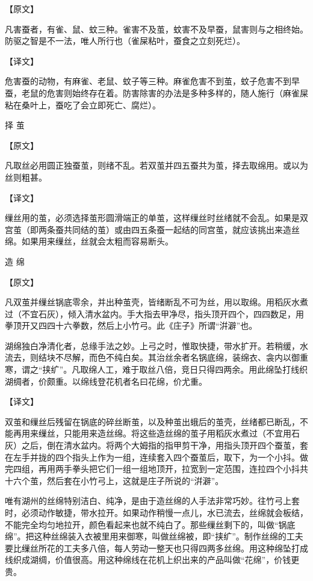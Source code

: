 \documentclass[12pt,UTF8]{ctexbook}
\begin{document}
【原文】

凡害蚕者，有雀、鼠、蚊三种。雀害不及茧，蚊害不及早蚕，鼠害则与之相终始。防驱之智是不一法，唯人所行也（雀屎粘叶，蚕食之立刻死烂）。

【译文】

危害蚕的动物，有麻雀、老鼠、蚊子等三种。麻雀危害不到茧，蚊子危害不到早蚕，老鼠的危害则始终存在着。防害除害的办法是多种多样的，随人施行（麻雀屎粘在桑叶上，蚕吃了会立即死亡、腐烂）。

择 茧

【原文】

凡取丝必用圆正独蚕茧，则绪不乱。若双茧并四五蚕共为茧，择去取绵用。或以为丝则粗甚。

【译文】

缫丝用的茧，必须选择茧形圆滑端正的单茧，这样缫丝时丝绪就不会乱。如果是双宫茧（即两条蚕共同结的茧）或由四五条蚕一起结的同宫茧，就应该挑出来造丝绵。如果用来缫丝，丝就会太粗而容易断头。

造 绵

【原文】

凡双茧并缫丝锅底零余，并出种茧壳，皆绪断乱不可为丝，用以取绵。用稻灰水煮过（不宜石灰），倾入清水盆内。手大指去甲净尽，指头顶开四个，四四数足，用拳顶开又四四十六拳数，然后上小竹弓。此《庄子》所谓“洴澼”也。

湖绵独白净清化者，总缘手法之妙。上弓之时，惟取快捷，带水扩开。若稍缓，水流去，则结块不尽解，而色不纯白矣。其治丝余者名锅底绵，装绵衣、衾内以御重寒，谓之“挟纩”。凡取绵人工，难于取丝八倍，竞日只得四两余。用此绵坠打线织湖绸者，价颇重。以绵线登花机者名曰花绵，价尤重。

【译文】

双茧和缫丝后残留在锅底的碎丝断茧，以及种茧出蛾后的茧壳，丝绪都已断乱，不能再用来缫丝，只能用来造丝绵。将这些造丝绵的茧子用稻灰水煮过（不宜用石灰）之后，倒在清水盆内。将两个大姆指的指甲剪干净，用指头顶开四个蚕茧，套在左手并拢的四个指头上作为一组，连续套入四个蚕茧后，取下，为一个小抖。做完四组，再用两手拳头把它们一组一组地顶开，拉宽到一定范围，连拉四个小抖共十六个茧，然后套在小竹弓上，这就是庄子所说的“洴澼”。

唯有湖州的丝绵特别洁白、纯净，是由于造丝绵的人手法非常巧妙。往竹弓上套时，必须动作敏捷，带水拉开。如果动作稍慢一点儿，水已流去，丝绵就会板结，不能完全均匀地拉开，颜色看起来也就不纯白了。那些缫丝剩下的，叫做“锅底绵”。把这种丝绵装入衣被里用来御寒，叫做丝绵被，即“挟纩”。制作丝绵的工夫要比缫丝所花的工夫多八倍，每人劳动一整天也只得四两多丝绵。用这种绵坠打成线织成湖绸，价值很高。用这种绵线在花机上织出来的产品叫做“花绵”，价钱更贵。
\end{document}
